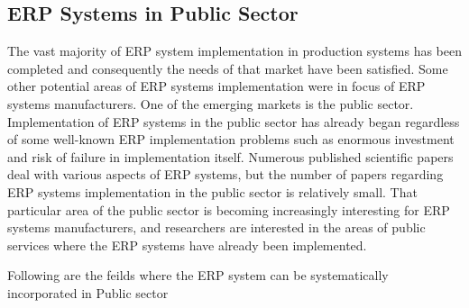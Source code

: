 
\subsection{ERP Systems in Public Sector}

The vast majority of ERP system implementation in
production systems has been completed and consequently
the needs of that market have been satisfied. Some other
potential areas of ERP systems implementation were in
focus of ERP systems manufacturers. One of the emerging
markets is the public sector. Implementation of ERP
systems in the public sector has already began regardless
of some well-known ERP implementation problems such
as enormous investment and risk of failure in
implementation itself. Numerous published scientific
papers deal with various aspects of ERP systems, but the
number of papers regarding ERP systems implementation
in the public sector is relatively small. That particular area
of the public sector is becoming increasingly interesting for
ERP systems manufacturers, and researchers are interested
in the areas of public services where the ERP systems have
already been implemented. \cite*[]{Robert2014}

Following are the feilds where the ERP system can be systematically incorporated in Public sector 

